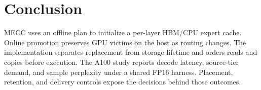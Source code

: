 \documentclass[conference,9pt,letterpaper]{IEEEtran}
\begin{document}
\section{Conclusion}
MECC uses an offline plan to initialize a per-layer HBM/CPU expert cache. Online promotion preserves GPU victims on the host as routing changes. The implementation separates replacement from storage lifetime and orders reads and copies before execution. The A100 study reports decode latency, source-tier demand, and sample perplexity under a shared FP16 harness. Placement, retention, and delivery controls expose the decisions behind those outcomes.

\clearpage
\nobalance
{}


\end{document}
